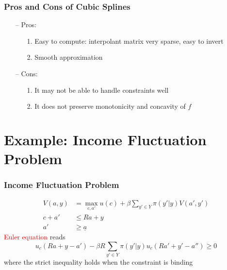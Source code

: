 \documentclass[aspectratio=169, 11pt]{beamer}
\begin{document}
\begin{frame}
\frametitle{Pros and Cons of Cubic Splines}
  \begin{itemize}
    \item[--] Pros:
    \begin{itemize}
      \item[1.] Easy to compute: interpolant matrix very sparse, easy to invert
      \item[2.] Smooth approximation
    \end{itemize}
    \bigskip
    \item[--] Cons:
    \begin{itemize}
      \item[1.] It may not be able to handle constraints well
      \item[2.] It does not preserve monotonicity and concavity of $f$
    \end{itemize}
  \end{itemize}
\end{frame}

\section{Example: Income Fluctuation Problem}

\begin{frame}
\frametitle{Income Fluctuation Problem}
  \begin{align*}
    V\left(a,y\right) & =\max_{c,a'} u\left(c\right)+\beta\sum_{y'\in Y}\pi\left(y'|y\right)V\left(a',y'\right)\\
    c+a' & \leqslant Ra+y\\
    a' & \geqslant\underline{a}
  \end{align*}
  \bigskip
  \textcolor{red}{Euler equation} reads
  \[
    u_{c}\left(Ra+y-a'\right)-\beta R\sum_{y'\in Y}\pi\left(y'|y\right)u_{c}\left(Ra'+y'-a''\right)\geqslant0
  \]
  where the strict inequality holds when the constraint is binding
\end{frame}
\end{document}
